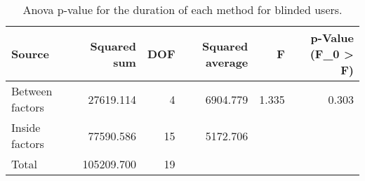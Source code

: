 
\begin{table}[!htb]
\centering
\caption{Anova p-value for the duration of each method for blinded users.}
\label{tab:anova_duration}
\begin{tabular}{lrrrrr}
\toprule
         Source &  Squared sum &  DOF & Squared average &     F & p-Value (F\_0 > F) \\
\midrule
Between factors &    27619.114 &    4 &        6904.779 & 1.335 &             0.303 \\
 Inside factors &    77590.586 &   15 &        5172.706 &       &                   \\
          Total &   105209.700 &   19 &                 &       &                   \\
\bottomrule
\end{tabular}
\end{table}

